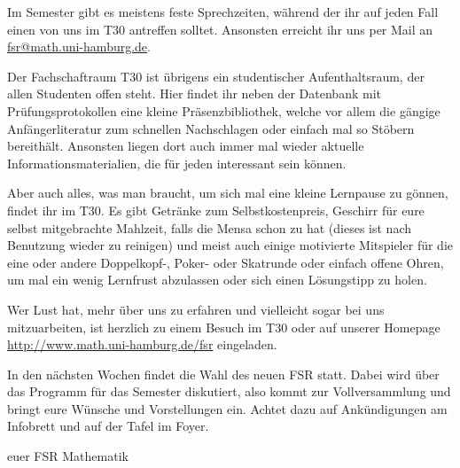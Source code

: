 Im Semester gibt es meistens feste Sprechzeiten, während der ihr auf jeden Fall
einen von uns im T30 antreffen solltet. Ansonsten erreicht ihr uns per Mail an
\href{mailto:fsr@math.uni-hamburg.de}{fsr@math.uni-hamburg.de}.

Der Fachschaftraum T30 ist übrigens ein studentischer Aufenthaltsraum, der
allen Studenten offen steht. Hier findet ihr neben der Datenbank mit
Prüfungsprotokollen eine kleine Präsenzbibliothek, welche vor allem die gängige
Anfängerliteratur zum schnellen Nachschlagen oder einfach mal so Stöbern
bereithält. Ansonsten liegen dort auch immer mal wieder aktuelle
Informationsmaterialien, die für jeden interessant sein können.

Aber auch alles, was man braucht, um sich mal eine kleine Lernpause zu gönnen,
findet ihr im T30. Es gibt Getränke zum Selbstkostenpreis, Geschirr für eure
selbst mitgebrachte Mahlzeit, falls die Mensa schon zu hat (dieses ist nach
Benutzung wieder zu reinigen) und meist auch einige motivierte Mitspieler für
die eine oder andere Doppelkopf-, Poker- oder Skatrunde oder einfach offene
Ohren, um mal ein wenig Lernfrust abzulassen oder sich einen Lösungstipp zu
holen.

Wer Lust hat, mehr über uns zu erfahren und vielleicht sogar bei uns
mitzuarbeiten, ist herzlich zu einem Besuch im T30 oder auf unserer Homepage
\url{http://www.math.uni-hamburg.de/fsr} eingeladen.

In den nächsten Wochen findet die Wahl des neuen FSR statt. Dabei wird über das
Programm für das Semester diskutiert, also kommt zur Vollversammlung und bringt
eure Wünsche und Vorstellungen ein. Achtet dazu auf Ankündigungen am Infobrett
und auf der Tafel im Foyer.

\hfill euer FSR Mathematik

